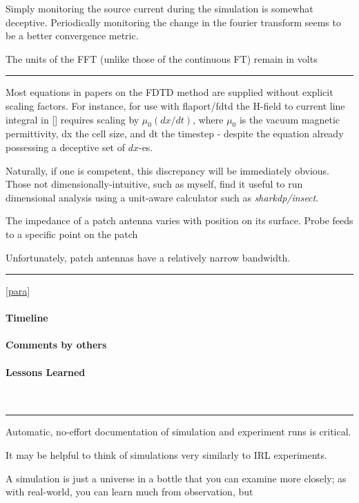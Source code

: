 \documentclass[paper.tex]{subfiles}
\begin{document}
Simply monitoring the source current during the simulation is somewhat deceptive. Periodically monitoring the change in the fourier transform seems to be a better convergence metric.

The units of the FFT (unlike those of the continuous FT) remain in volts

\rule{\linewidth}{0.2pt}

Most equations in papers on the FDTD method are supplied without explicit scaling factors. For instance, for use with flaport/fdtd the H-field to current line integral in [] requires scaling by $\mu_0  (dx/dt)$, where $\mu_0$ is the vacuum magnetic permittivity, dx the cell size, and dt the timestep - despite the equation already possessing a deceptive set of $dx$-es.

Naturally, if one is competent, this discrepancy will be immediately obvious. Those not dimensionally-intuitive, such as myself, find it useful to run dimensional analysis using a unit-aware calculator such as {\it sharkdp/insect}.


The impedance of a patch antenna varies with position on its surface. Probe feeds to a specific point on the patch

Unfortunately, patch antennas have a relatively narrow bandwidth.

\rule{\linewidth}{0.2pt}


\label{para}
\ref{para}

\paragraph{Timeline}

\paragraph{Comments by others}

\paragraph{Lessons Learned} \


\rule{\linewidth}{0.2pt}

Automatic, no-effort documentation of simulation and experiment runs is critical.

It may be helpful to think of simulations very similarly to IRL experiments. 

A simulation is just a universe in a bottle that you can examine more closely; as with real-world, you can learn much from observation, but 
\end{document}
